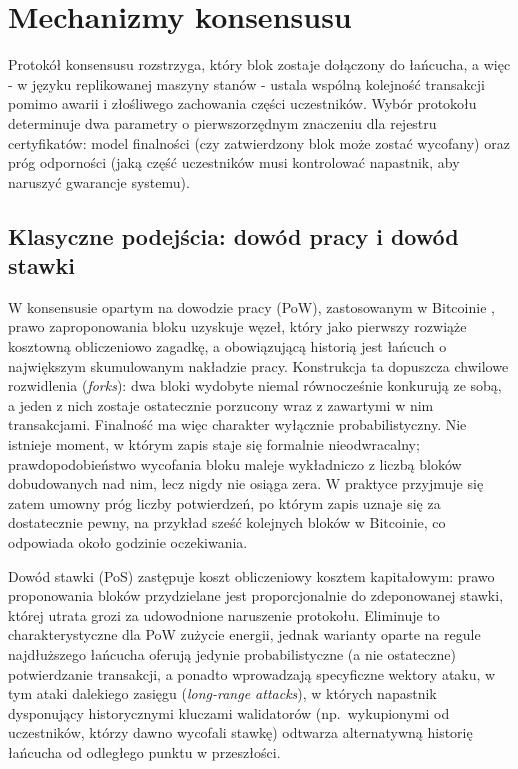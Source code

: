 \section{Mechanizmy konsensusu}
\label{sec:konsensus}

Protokół konsensusu rozstrzyga, który blok zostaje dołączony do łańcucha, a więc - w języku replikowanej maszyny stanów - ustala wspólną kolejność transakcji pomimo awarii i złośliwego zachowania części uczestników. Wybór protokołu determinuje dwa parametry o pierwszorzędnym znaczeniu dla rejestru certyfikatów: model finalności (czy zatwierdzony blok może zostać wycofany) oraz próg odporności (jaką część uczestników musi kontrolować napastnik, aby naruszyć gwarancje systemu).

\subsection{Klasyczne podejścia: dowód pracy i dowód stawki}
\label{subsec:pow-pos}

W konsensusie opartym na dowodzie pracy (PoW), zastosowanym w Bitcoinie \cite{nakamoto2008bitcoin}, prawo zaproponowania bloku uzyskuje węzeł, który jako pierwszy rozwiąże kosztowną obliczeniowo zagadkę, a obowiązującą historią jest łańcuch o największym skumulowanym nakładzie pracy. Konstrukcja ta dopuszcza chwilowe rozwidlenia (\emph{forks}): dwa bloki wydobyte niemal równocześnie konkurują ze sobą, a jeden z nich zostaje ostatecznie porzucony wraz z zawartymi w nim transakcjami. Finalność ma więc charakter wyłącznie probabilistyczny. Nie istnieje moment, w którym zapis staje się formalnie nieodwracalny; prawdopodobieństwo wycofania bloku maleje wykładniczo z liczbą bloków dobudowanych nad nim, lecz nigdy nie osiąga zera. W praktyce przyjmuje się zatem umowny próg liczby potwierdzeń, po którym zapis uznaje się za dostatecznie pewny, na przykład sześć kolejnych bloków w Bitcoinie, co odpowiada około godzinie oczekiwania.

Dowód stawki (PoS) \cite{king2012ppcoin} zastępuje koszt obliczeniowy kosztem kapitałowym: prawo proponowania bloków przydzielane jest proporcjonalnie do zdeponowanej stawki, której utrata grozi za udowodnione naruszenie protokołu. Eliminuje to charakterystyczne dla PoW zużycie energii, jednak warianty oparte na regule najdłuższego łańcucha oferują jedynie probabilistyczne (a nie ostateczne) potwierdzanie transakcji, a ponadto wprowadzają specyficzne wektory ataku, w tym ataki dalekiego zasięgu (\emph{long-range attacks}), w których napastnik dysponujący historycznymi kluczami walidatorów (np.\ wykupionymi od uczestników, którzy dawno wycofali stawkę) odtwarza alternatywną historię łańcucha od odległego punktu w przeszłości.

